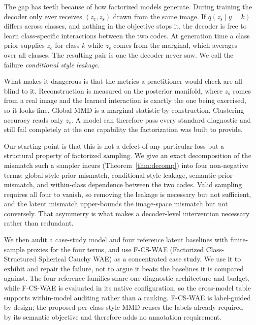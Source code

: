 \documentclass[letterpaper]{article} %
\newcommand{\ours}{F-CS-WAE}
\newcommand{\zc}{z_{\mathrm{c}}}
\newcommand{\zs}{z_{\mathrm{s}}}
\begin{document}
The gap has teeth because of how factorized models generate. During
training the decoder only ever receives $(\zc,\zs)$ drawn from the same
image. If $q(\zs\mid y{=}k)$ differs across classes, and nothing in the
objective stops it, the decoder is free to learn class-specific interactions
between the two codes. At generation time a class prior supplies $\zc$ for
class $k$ while $\zs$ comes from the marginal, which averages over all
classes. The resulting pair is one the decoder never saw. We call the
failure \emph{conditional style leakage}.

What makes it dangerous is that the metrics a practitioner would check are
all blind to it. Reconstruction is measured on the posterior manifold, where
$\zs$ comes from a real image and the learned interaction is exactly the one
being exercised, so it looks fine. Global MMD is a marginal statistic by
construction. Clustering accuracy reads only $\zc$. A model can therefore
pass every standard diagnostic and still fail completely at the one
capability the factorization was built to provide.

Our starting point is that this is not a defect of any particular loss but a
structural property of factorized sampling. We give an exact decomposition
of the mismatch such a sampler incurs (Theorem~\ref{thm:decomp}) into four
non-negative terms: global style-prior mismatch, conditional style leakage,
semantic-prior mismatch, and within-class dependence between the two codes.
Valid sampling requires all four to vanish, so removing the leakage is
necessary but not sufficient, and the latent mismatch upper-bounds the
image-space mismatch but not conversely. That asymmetry is what makes a
decoder-level intervention necessary rather than redundant.

We then audit a case-study model and four reference latent baselines with
finite-sample proxies for the four terms, and use \ours{} (Factorized
Class-Structured Spherical Cauchy WAE) as
a concentrated case study. We use it to exhibit and repair the failure, not
to argue it beats the baselines it is compared against. The four reference
families share one diagnostic architecture and budget, while \ours{} is
evaluated in its native configuration, so the cross-model table supports
within-model auditing rather than a ranking. \ours{} is label-guided by
design; the proposed per-class style MMD reuses the labels already required
by its semantic objective and therefore adds no annotation requirement.
\end{document}
